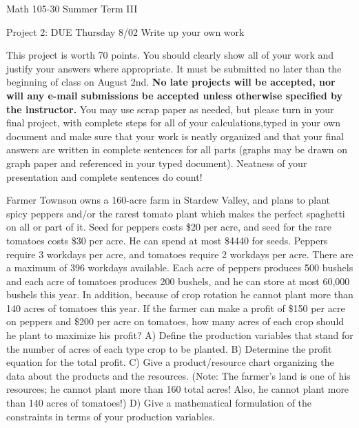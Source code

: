 \documentclass[11pt,epsfig]{article}
\begin{document}
Math 105-30 Summer Term III 

Project 2: DUE Thursday 8/02
\newline
Write up your own work
\vspace{1pc}

This project is worth 70 points. You should clearly show all of your work and justify your answers where appropriate. It must be submitted no later than the beginning of class on August 2nd. \textbf{No late projects will be accepted, nor will any e-mail submissions be accepted unless otherwise specified by the instructor.} You may use scrap paper as needed, but please turn in your final project, with complete steps for all of your calculations,typed in your own document and make sure that your work is neatly organized and that your final answers are written in complete sentences for all parts (graphs may be drawn on graph paper and referenced in your typed document). Neatness of your presentation and complete sentences do count! \bigskip
\vspace{0.5pc}






\begin{problem}{25}
Farmer Townson owns a 160-acre farm in Stardew Valley, and plans to plant spicy peppers and/or the rarest tomato plant which makes the perfect spaghetti on all or part of it. Seed for peppers costs \$20 per acre, and seed for the rare tomatoes costs \$30 per acre. He can spend at most \$4440 for seeds. Peppers require 3 workdays per acre, and tomatoes require 2 workdays per acre. There are a maximum of 396 workdays available. Each acre of peppers produces 500 bushels and each acre of tomatoes produces 200 bushels, and he can store at most 60,000 bushels this year. In addition, because of crop rotation he cannot plant more than 140 acres of tomatoes this year. If the farmer can make a profit of \$150 per acre on peppers and \$200 per acre on tomatoes, how many acres of each crop should he plant to maximize his profit?
\newline
A) Define the production variables that stand for the number of acres of each type crop to be planted.
\newline
B) Determine the profit equation for the total profit.
\newline 
C) Give a product/resource chart organizing the data about the products and the resources.
(Note: The farmer’s land is one of his resources; he cannot plant more than 160 total acres!
Also, he cannot plant more than 140 acres of tomatoes!)
\newline
D) Give a mathematical formulation of the constraints in terms of your production variables.
\vfill
\end{problem}
\end{document}
